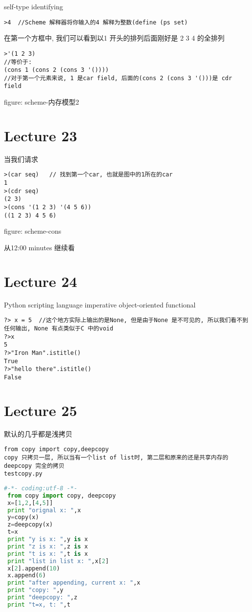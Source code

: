\documentclass{article}
\begin{document}
self-type identifying
\begin{verbatim}
>4  //Scheme 解释器将你输入的4 解释为整数(define (ps set)
\end{verbatim}
在第一个方框中, 我们可以看到以1 开头的排列后面刚好是 2 3 4 的全排列

\begin{verbatim}
>'(1 2 3)
//等价于: 
(cons 1 (cons 2 (cons 3 '())))
//对于第一个元素来说, 1 是car field, 后面的(cons 2 (cons 3 '()))是 cdr field
\end{verbatim}
figure: scheme-内存模型2
 
\section{Lecture 23}
当我们请求
\begin{verbatim}
>(car seq)   // 找到第一个car, 也就是图中的1所在的car
1
>(cdr seq)
(2 3)
>(cons '(1 2 3) '(4 5 6))
((1 2 3) 4 5 6)
\end{verbatim}
figure: scheme-cons
 
从12:00 minutes 继续看

\section{Lecture 24}
Python
scripting language
imperative
object-oriented
functional

\begin{verbatim}
?> x = 5  //这个地方实际上输出的是None, 但是由于None 是不可见的, 所以我们看不到任何输出, None 有点类似于C 中的void
?>x
5
?>"Iron Man".istitle()
True
?>"hello there".istitle()
False
\end{verbatim}

\section{Lecture 25}
默认的几乎都是浅拷贝

\begin{verbatim}
from copy import copy,deepcopy
copy 只拷贝一层, 所以当有一个list of list时, 第二层和原来的还是共享内存的
deepcopy 完全的拷贝
testcopy.py
\end{verbatim}

\begin{lstlisting}[language = Python]
#-*- coding:utf-8 -*-
 from copy import copy, deepcopy
 x=[1,2,[4,5]]
 print "orignal x: ",x
 y=copy(x)
 z=deepcopy(x)
 t=x
 print "y is x: ",y is x
 print "z is x: ",z is x
 print "t is x: ",t is x
 print "list in list x: ",x[2]
 x[2].append(10)
 x.append(6)
 print "after appending, current x: ",x
 print "copy: ",y
 print "deepcopy: ",z
 print "t=x, t: ",t
 \end{lstlisting} 
\end{document}
